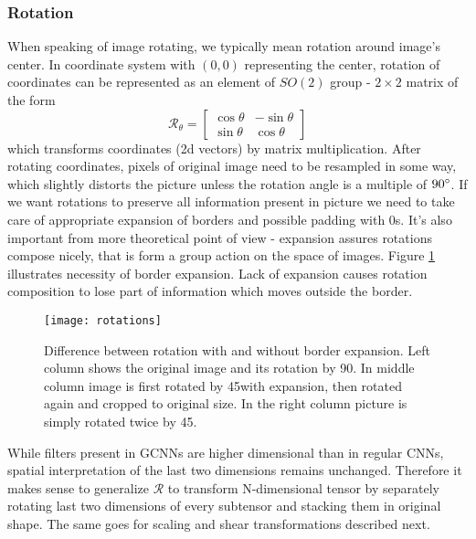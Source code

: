     \subsubsection{Rotation}
        When speaking of image rotating, we typically mean rotation around
        image's center. In coordinate system with $(0,0)$ representing the
        center, rotation of coordinates
        can be represented as an element of $SO(2)$ group - $2\times2$ matrix of
        the form
        $$\mathcal{R}_\theta = \begin{bmatrix}
                \cos\theta & -\sin\theta \\
                \sin\theta &  \cos\theta
            \end{bmatrix}$$
        which transforms coordinates (2d vectors) by matrix multiplication.
        After rotating coordinates, pixels of original image need to be resampled
        in some way, which slightly distorts the picture unless the rotation angle
        is a multiple of $90\degree$. If we want rotations to preserve all
        information present in picture
        we need to take care of appropriate
        expansion of borders and possible padding with 0s.
        It's also important from more theoretical point of view - expansion
        assures rotations compose nicely, that is form a group
        action on the space of images.
        Figure
        \ref{fig:rotation_pics} illustrates necessity of border expansion.
        Lack of expansion causes rotation composition to lose part of
        information which moves outside the border.

        \begin{figure}[h]
            \centering
            \texttt{[image: rotations]}
            \caption{Difference between rotation with and without border
                expansion. Left column shows the original image and its
                rotation by 90\degree. In middle column image is first rotated
                by 45\degree with expansion, then rotated again and cropped to
                original size. In the right column picture is simply rotated
                twice by 45\degree.}
            \label{fig:rotation_pics}
        \end{figure}
        While filters present in GCNNs are higher dimensional than in regular
        CNNs, spatial interpretation of the last two dimensions remains
        unchanged. Therefore it makes sense to generalize $\mathcal{R}$ to
        transform N-dimensional tensor by separately rotating last two
        dimensions of every subtensor and stacking them in original shape.
        The same goes for scaling and shear transformations described next.

